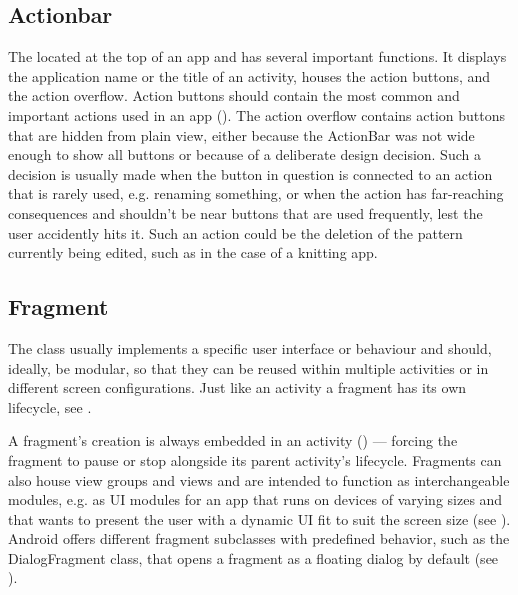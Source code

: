 \subsection{Actionbar}
The  located at the top of an app and has several important functions. It displays the application name or the title of an activity, houses the action buttons, and the action overflow. Action buttons should contain the most common and important actions used in an app (\cite{actionbar}). The action overflow contains action buttons that are hidden from plain view, either because the ActionBar was not wide enough to show all buttons or because of a deliberate design decision. Such a decision is usually made when the button in question is connected to an action that is rarely used, e.g. renaming something, or when the action has far-reaching consequences and shouldn't be near buttons that are used frequently, lest the user accidently hits it. Such an action could be the deletion of the pattern currently being edited, such as in the case of a knitting app. 

\subsection{Fragment}
\label{impl:fragment}
The  class usually implements a specific user interface or behaviour and should, ideally, be modular, so that they can be reused within multiple activities or in different screen configurations. Just like an activity a fragment has its own lifecycle, see .

A fragment's creation is always embedded in an activity (\cite{androidfragment}) --- forcing the fragment to pause or stop alongside its parent activity's lifecycle. Fragments can also house view groups and views and are intended to function as interchangeable modules, e.g. as \gls{UI} modules for an app that runs on devices of varying sizes and that wants to present the user with a dynamic \gls{UI} fit to suit the screen size (see ). Android offers different fragment subclasses with predefined behavior, such as the DialogFragment class, that opens a fragment as a floating dialog by default (see ).

